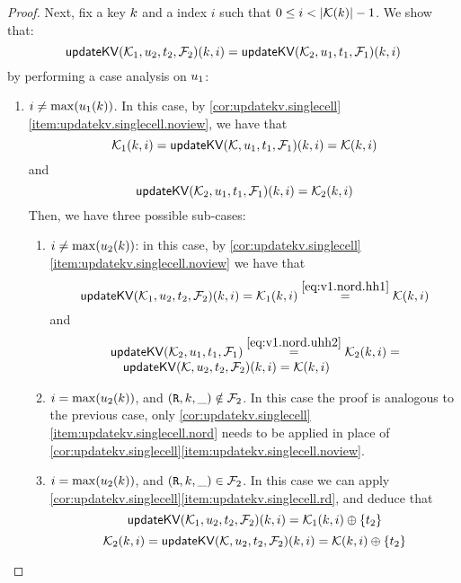 \begin{proof}
Next, fix a key $k$ and a index $i$ such that $0 \leq i < \lvert  \mathcal{K}(k)  \rvert - 1$. 
We show that:
\[ 
    \mathsf{updateKV}(\mathcal{K}_1,u_2,t_2,\mathcal{F}_2)(k, i) = \mathsf{updateKV}(\mathcal{K}_2, u_1, t_1, \mathcal{F}_1)(k, i)
\]
by performing a case analysis on $u_1$: 
\begin{enumerate}
\item $i \neq \max(u_1(k))$. 
In this case, by \cref{cor:updatekv.singlecell}\eqref{item:updatekv.singlecell.noview}, 
we have that 
\begin{equation}
\mathcal{K}_1(k, i) = \mathsf{updateKV}(\mathcal{K}, u_1, t_1, \mathcal{F}_1)(k, i) = \mathcal{K}(k, i)
\label{eq:v1.nord.hh1}
\end{equation}
and 
\begin{equation}
\mathsf{updateKV}(\mathcal{K}_2, u_1, t_1, \mathcal{F}_1)(k, i) = \mathcal{K}_2(k, i)
\label{eq:v1.nord.uhh2}
\end{equation}
Then, we have three possible sub-cases: 
\begin{enumerate}
\item $i \neq \max(u_2(k))$: in this case, by \cref{cor:updatekv.singlecell}\eqref{item:updatekv.singlecell.noview} we have that 
\[\mathsf{updateKV}(\mathcal{K}_1, u_2, t_2, \mathcal{F}_2)(k, i) = 
\mathcal{K}_1(k, i) \stackrel{\eqref{eq:v1.nord.hh1}}{=} \mathcal{K}(k, i)
\]
and
\[
\begin{array}{l}
\mathsf{updateKV}(\mathcal{K}_2, u_1, t_1, \mathcal{F}_1) \stackrel{\eqref{eq:v1.nord.uhh2}}{=} \mathcal{K}_2(k,i) = \\
\quad \mathsf{updateKV}(\mathcal{K}, u_2, t_2, \mathcal{F}_2)(k, i) = \mathcal{K}(k, i)
\end{array}
\]
\item $i = \max(u_2(k))$, and $(\texttt{R}, k, \_) \notin \mathcal{F}_2$. In this case the proof is analogous to the previous case, 
only \cref{cor:updatekv.singlecell}\eqref{item:updatekv.singlecell.nord} needs to be applied in place 
of \cref{cor:updatekv.singlecell}\eqref{item:updatekv.singlecell.noview}.
\item $i = \max(u_2(k))$, and $(\texttt{R}, k, \_) \in \mathcal{F}_2$. In this case we can apply \cref{cor:updatekv.singlecell}\eqref{item:updatekv.singlecell.rd}, 
and deduce that 
\begin{equation}
\mathsf{updateKV}(\mathcal{K}_1, u_2, t_2, \mathcal{F}_2)(k, i) = \mathcal{K}_1(k, i) \oplus \{t_2\}
\label{eq:v1.nord.v2.rd.uhh1}
\end{equation}
\begin{equation}
\hh_2(\ke, i) = \updateKV(\hh, \vi_2, \txid_2, \opset_2)(\ke, i) = \hh(\ke,i) \oplus \{\txid_2\}
\label{eq:v1.nord.v2.rd.hh2}

\end{equation}
\end{enumerate}
\end{enumerate}
\end{proof}
